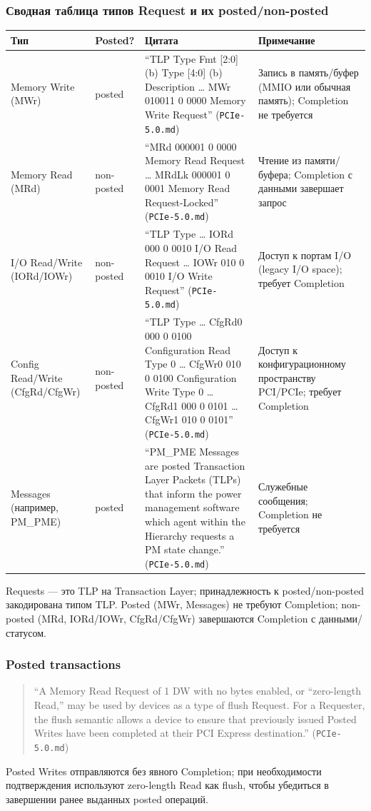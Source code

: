 \documentclass[a4paper,12pt]{article}
\begin{document}
\subsubsection{Сводная таблица типов Request и их posted/non-posted}
\begin{center}
\begin{tabular}{|p{3cm}|p{2.2cm}|p{6.2cm}|p{4.3cm}|}
\hline
Тип & Posted? & Цитата & Примечание \\
\hline
Memory Write (MWr) & posted & ``TLP Type Fmt [2:0](b) Type [4:0] (b) Description … MWr 010011 0 0000 Memory Write Request'' (\texttt{PCIe-5.0.md}) & Запись в память/буфер (MMIO или обычная память); Completion не требуется \\ \hline
Memory Read (MRd) & non-posted & ``MRd 000001 0 0000 Memory Read Request … MRdLk 000001 0 0001 Memory Read Request-Locked'' (\texttt{PCIe-5.0.md}) & Чтение из памяти/буфера; Completion с данными завершает запрос \\ \hline
I/O Read/Write (IORd/IOWr) & non-posted & ``TLP Type … IORd 000 0 0010 I/O Read Request … IOWr 010 0 0010 I/O Write Request'' (\texttt{PCIe-5.0.md}) & Доступ к портам I/O (legacy I/O space); требует Completion \\ \hline
Config Read/Write (CfgRd/CfgWr) & non-posted & ``TLP Type … CfgRd0 000 0 0100 Configuration Read Type 0 … CfgWr0 010 0 0100 Configuration Write Type 0 … CfgRd1 000 0 0101 … CfgWr1 010 0 0101'' (\texttt{PCIe-5.0.md}) & Доступ к конфигурационному пространству PCI/PCIe; требует Completion \\ \hline
Messages (например, PM\_PME) & posted & ``PM\_PME Messages are posted Transaction Layer Packets (TLPs) that inform the power management software which agent within the Hierarchy requests a PM state change.'' (\texttt{PCIe-5.0.md}) & Служебные сообщения; Completion не требуется \\ \hline
\end{tabular}
\end{center}
Requests — это TLP на Transaction Layer; принадлежность к posted/non-posted закодирована типом TLP. Posted (MWr, Messages) не требуют Completion; non-posted (MRd, IORd/IOWr, CfgRd/CfgWr) завершаются Completion с данными/статусом.
\subsubsection{Posted transactions}
\begin{quote}
``A Memory Read Request of 1 DW with no bytes enabled, or “zero-length Read,” may be used by devices as a type of flush Request. For a Requester, the flush semantic allows a device to ensure that previously issued Posted Writes have been completed at their PCI Express destination.'' (\texttt{PCIe-5.0.md})
\end{quote}
Posted Writes отправляются без явного Completion; при необходимости подтверждения используют zero-length Read как flush, чтобы убедиться в завершении ранее выданных posted операций.
\end{document}
